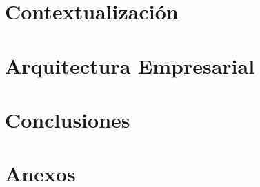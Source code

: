 \documentclass[paper=A4,twoside=true,openright,parskip=full,chapterprefix=true,11pt,headings=normal,bibliography=totoc,listof=totoc,titlepage=on,captions=tableabove,draft=false
]{scrreprt}
\begin{document}
	\pagestyle{empty}
	

	\cleardoublepage
	\pagestyle{plain}
	

	\cleardoublepage
	
	\cleardoublepage
	

	\cleardoublepage
	\dominitoc
	\setcounter{tocdepth}{2}
	\tableofcontents
	\cleardoublepage
	\listoffigures
	\cleardoublepage
	\listoftables
	\cleardoublepage
	\setcounter{page}{1}
	\pagestyle{maincontentstyle}

	\part{Contextualización}
		
		
	\part{Arquitectura Empresarial}
		
		
		
		
		
	\part{Conclusiones}
		\cleardoublepage
		
		\cleardoublepage
		
		\cleardoublepage
		
	\part{Anexos}
		\cleardoublepage
		\appendix
		
		\clearpage
		\newpage
		\mbox{}
\end{document}
